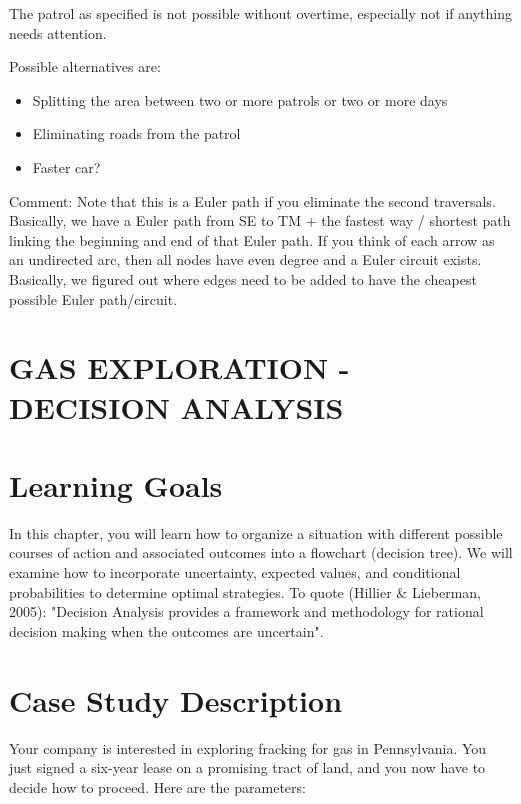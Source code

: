 \documentclass[10pt]{article}
\begin{document}
The patrol as specified is not possible without overtime, especially not if anything needs attention.

Possible alternatives are:

\begin{itemize}
  \item Splitting the area between two or more patrols or two or more days

  \item Eliminating roads from the patrol

  \item Faster car?

\end{itemize}
Comment: Note that this is a Euler path if you eliminate the second traversals. Basically, we have a Euler path from SE to TM + the fastest way / shortest path linking the beginning and end of that Euler path. If you think of each arrow as an undirected arc, then all nodes have even degree and a Euler circuit exists. Basically, we figured out where edges need to be added to have the cheapest possible Euler path/circuit.

\section{GAS EXPLORATION - DECISION ANALYSIS}
\section{Learning Goals}
In this chapter, you will learn how to organize a situation with different possible courses of action and associated outcomes into a flowchart (decision tree). We will examine how to incorporate uncertainty, expected values, and conditional probabilities to determine optimal strategies. To quote (Hillier \& Lieberman, 2005): "Decision Analysis provides a framework and methodology for rational decision making when the outcomes are uncertain".

\section{Case Study Description}
Your company is interested in exploring fracking for gas in Pennsylvania. You just signed a six-year lease on a promising tract of land, and you now have to decide how to proceed. Here are the parameters:
\end{document}
